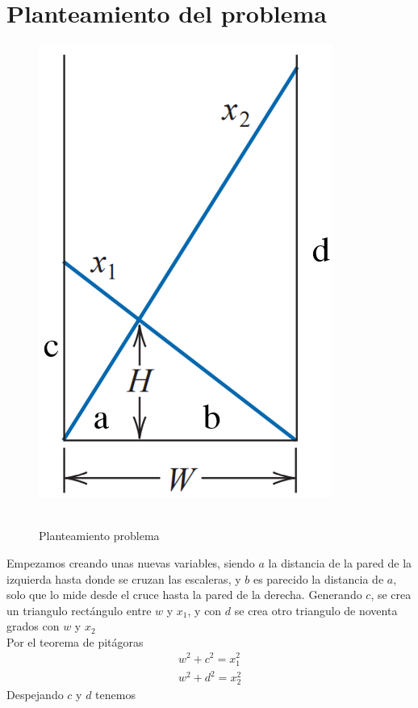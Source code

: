 \documentclass[ceqn,10pt]{SelfArx}
\begin{document}
\section{Planteamiento del problema}
\begin{figure}[ht]\centering
	\includegraphics[scale=0.4]{planteamiento.png}\\\
	\caption{Planteamiento problema}
	\label{fig:planteamiento}
\end{figure}
Empezamos creando unas nuevas variables, siendo $a$ la distancia de la pared
de la izquierda hasta donde se cruzan las escaleras, y $b$ es parecido la
distancia de $a$, solo que lo mide desde el cruce hasta la pared de la
derecha. Generando $c$, se crea un triangulo rectángulo entre $w$ y
$x_{1}$, y con $d$ se crea otro triangulo de noventa grados con $w$ y
$x_{2}$\\
Por el teorema de pitágoras
\begin{equation} \label{eq:pitagoras}
\begin{aligned}
	w^2+c^2=x_{1}^2\\
	w^2+d^2=x_{2}^2
\end{aligned}
\end{equation}
Despejando $c$ y $d$ tenemos
\end{document}
